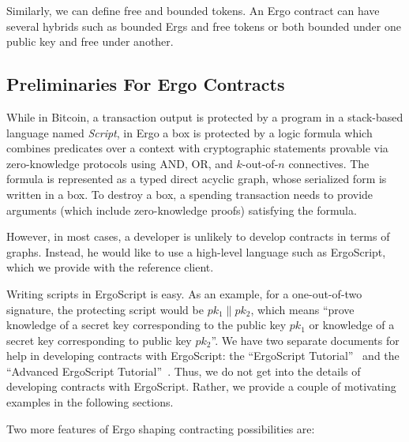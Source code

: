  Similarly, we can define free and bounded tokens. An Ergo contract can have several hybrids such as bounded Ergs and free tokens or both bounded under one public key and free under another.

\subsection{Preliminaries For Ergo Contracts}

  While in Bitcoin, a transaction output is protected by a program in a stack-based language named {\em Script}, in Ergo a box is protected by a logic formula which combines predicates over a context with cryptographic statements provable via zero-knowledge protocols using AND, OR, and $k$-out-of-$n$ connectives. The formula is represented as a typed direct
 acyclic graph, whose serialized form is written in a box. To destroy a box, a spending transaction needs to provide arguments (which include zero-knowledge proofs) satisfying the formula.

 However, in most cases, a developer is unlikely to develop contracts in terms of graphs. Instead, he would like to use a high-level language such as ErgoScript, which we provide with the reference client. 
 
 Writing scripts in ErgoScript is easy. As an
 example, for a one-out-of-two signature, the protecting script would be ${pk_1 \|pk_2}$, which means ``prove knowledge of
 a secret key corresponding to the public key $pk_1$ or knowledge of a secret key corresponding to public key $pk_2$''. We have
 two separate documents for help in developing contracts with ErgoScript: the ``ErgoScript Tutorial''~\cite{ergoTutorial}
 and the ``Advanced ErgoScript Tutorial''~\cite{ergoAdvTutorial}. Thus, we do not get into the details of developing contracts with ErgoScript. Rather, we provide a couple of motivating examples in the following sections.

Two more features of Ergo shaping contracting possibilities are:

